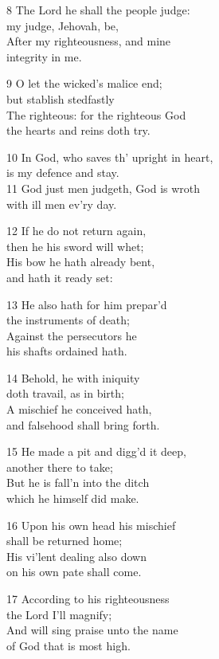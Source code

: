 \begin{multicols}{3}
8 The Lord he shall the people judge:\\
my judge, Jehovah, be,\\
After my righteousness, and mine\\
integrity in me.

9 O let the wicked’s malice end;\\
but stablish stedfastly\\
The righteous: for the righteous God\\
the hearts and reins doth try.

10 In God, who saves th’ upright in heart,\\
is my defence and stay.\\
11 God just men judgeth, God is wroth\\
with ill men ev’ry day.

12 If he do not return again,\\
then he his sword will whet;\\
His bow he hath already bent,\\
and hath it ready set:

13 He also hath for him prepar’d\\
the instruments of death;\\
Against the persecutors he\\
his shafts ordained hath.

14 Behold, he with iniquity\\
doth travail, as in birth;\\
A mischief he conceived hath,\\
and falsehood shall bring forth.

15 He made a pit and digg’d it deep,\\
another there to take;\\
But he is fall’n into the ditch\\
which he himself did make.

16 Upon his own head his mischief\\
shall be returned home;\\
His vi’lent dealing also down\\
on his own pate shall come.

17 According to his righteousness\\
the Lord I’ll magnify;\\
And will sing praise unto the name\\
of God that is most high.

\begin{center}
\quad{}\quad{}
\end{center}


\end{multicols}
